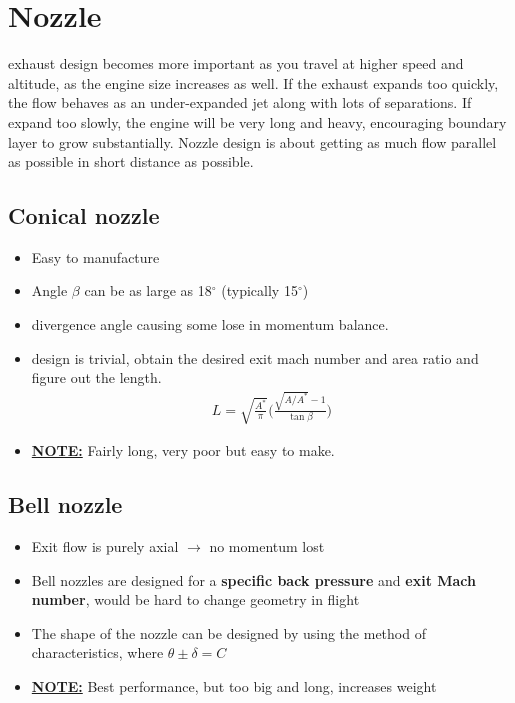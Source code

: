\documentclass[a4paper,10pt]{article}
\begin{document}
\newpage
\section{Nozzle}
exhaust design becomes more important as you travel at higher speed and altitude, as the engine size increases as well. If the exhaust expands too quickly, the flow behaves as an under-expanded jet along with lots of separations. If expand too slowly, the engine will be very long and heavy, encouraging boundary layer to grow substantially. Nozzle design is about getting as much flow parallel as possible in short distance as possible. 

\subsection{Conical nozzle}
\begin{itemize}
    \item Easy to manufacture
    \item Angle $\beta$ can be as large as 18$^{\circ}$ (typically 15$^{\circ}$)
    \item divergence angle causing some lose in momentum balance. 
    \item design is trivial, obtain the desired exit mach number and area ratio and figure out the length. 
        \begin{gather*}
            L = \sqrt{\frac{A^*}{\pi}}\Bigg(\frac{\sqrt{A/A^*}-1}{\tan\beta}\Bigg)
        \end{gather*}
    \item \underline{\textbf{NOTE:}} Fairly long, very poor but easy to make.
\end{itemize}

\subsection{Bell nozzle}
\begin{itemize}
    \item Exit flow is purely axial $\rightarrow$ no momentum lost 
    \item Bell nozzles are designed for a \textbf{specific back pressure} and \textbf{exit Mach number}, would be hard to change geometry in flight
    \item The shape of the nozzle can be designed by using the method of characteristics, where $\theta\pm\delta=C$
    \item \underline{\textbf{NOTE:}} Best performance, but too big and long, increases weight 
\end{itemize}
\end{document}
